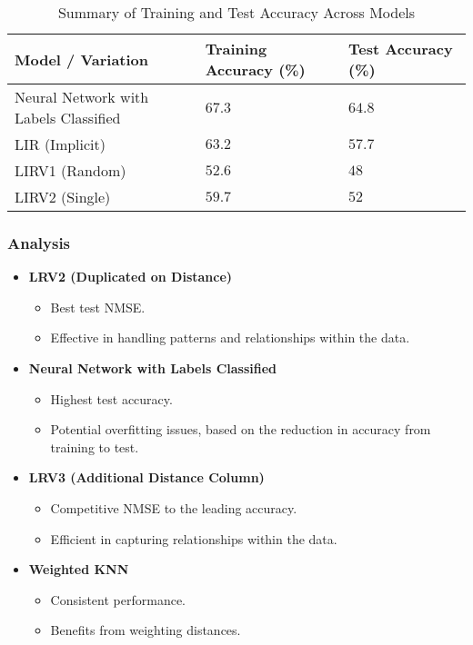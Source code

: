 \documentclass[a4paper, 12pt]{report}
\begin{document}
\begin{table}[H]
    \centering
    \caption{Summary of Training and Test Accuracy Across Models}
    \label{tab:summary_accuracy_all_models_accuracy_exp2}
    \footnotesize
    \begin{tabular}{|l|l|l|}
    \toprule
    \textbf{Model / Variation} & \textbf{Training Accuracy (\%)} & \textbf{Test Accuracy (\%)} \\
    \midrule
    Neural Network with Labels Classified & $67.3$ & $\mathbf{64.8}$ \\
    LIR (Implicit) & $63.2$ & $57.7$ \\
    LIRV1 (Random) & $52.6$ & $48$ \\
    LIRV2 (Single) & $59.7$ & $52$ \\
    \bottomrule
    \end{tabular}
\end{table}

\subsubsection{Analysis}

\begin{itemize}
    \item \textbf{LRV2 (Duplicated on Distance)}
    \begin{itemize}
        \item Best test NMSE.
        \item Effective in handling patterns and relationships within the data.
    \end{itemize}
    
    \item \textbf{Neural Network with Labels Classified}
    \begin{itemize}
        \item Highest test accuracy.
        \item Potential overfitting issues, based on the reduction in accuracy from training to test.
    \end{itemize}
    
    \item \textbf{LRV3 (Additional Distance Column)}
    \begin{itemize}
        \item Competitive NMSE to the leading accuracy.
        \item Efficient in capturing relationships within the data.
    \end{itemize}
    
    \item \textbf{Weighted KNN}
    \begin{itemize}
        \item Consistent performance.
        \item Benefits from weighting distances.
    \end{itemize}
\end{itemize}
\end{document}
